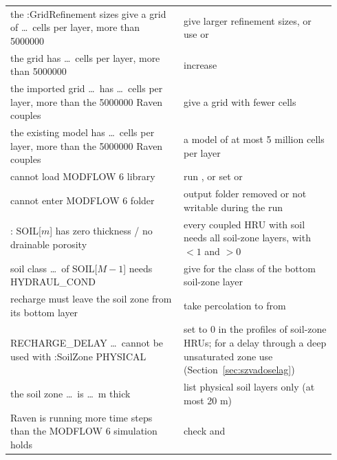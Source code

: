 \begin{longtable}{P{0.5\linewidth}P{0.44\linewidth}}
the :GridRefinement sizes give a grid of \dots\ cells per layer, more than 5000000 & give larger refinement sizes, or use  or \\
the grid has \dots\ cells per layer, more than 5000000 & increase \\
the imported grid \dots\ has \dots\ cells per layer, more than the 5000000 Raven couples & give a grid with fewer cells\\
the existing model has \dots\ cells per layer, more than the 5000000 Raven couples & a model of at most 5 million cells per layer\\
cannot load MODFLOW 6 library & run , or set  or \\
cannot enter MODFLOW 6 folder & output folder removed or not writable during the run\\
: SOIL[$m$] has zero thickness / no drainable porosity & every coupled HRU with soil needs all soil-zone layers, with  $<1$ and  $>0$\\
soil class \dots\ of SOIL[$M-1$] needs HYDRAUL\_COND & give  for the class of the bottom soil-zone layer\\
recharge must leave the soil zone from its bottom layer & take percolation to  from \\
RECHARGE\_DELAY \dots\ cannot be used with :SoilZone PHYSICAL & set  to 0 in the profiles of soil-zone HRUs; for a delay through a deep unsaturated zone use  (Section~\ref{sec:szvadoselag})\\
the soil zone \dots\ is \dots\ m thick & list physical soil layers only (at most 20 m)\\
Raven is running more time steps than the MODFLOW 6 simulation holds & check  and \\\bottomrule
\end{longtable}

